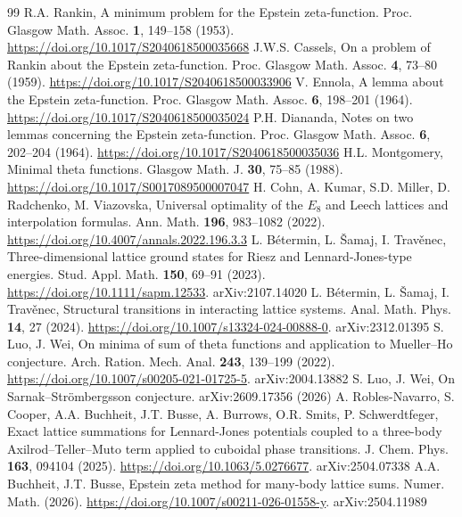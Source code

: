 \documentclass[10pt,twocolumn,a4paper]{article}
\theoremstyle{definition}
\begin{document}
\begin{thebibliography}{99}\footnotesize
{} R.A. Rankin, A minimum problem for the Epstein zeta-function. Proc. Glasgow Math. Assoc. \textbf{1}, 149--158 (1953). \url{https://doi.org/10.1017/S2040618500035668}
 J.W.S. Cassels, On a problem of Rankin about the Epstein zeta-function. Proc. Glasgow Math. Assoc. \textbf{4}, 73--80 (1959). \url{https://doi.org/10.1017/S2040618500033906}
 V. Ennola, A lemma about the Epstein zeta-function. Proc. Glasgow Math. Assoc. \textbf{6}, 198--201 (1964). \url{https://doi.org/10.1017/S2040618500035024}
 P.H. Diananda, Notes on two lemmas concerning the Epstein zeta-function. Proc. Glasgow Math. Assoc. \textbf{6}, 202--204 (1964). \url{https://doi.org/10.1017/S2040618500035036}
 H.L. Montgomery, Minimal theta functions. Glasgow Math. J. \textbf{30}, 75--85 (1988). \url{https://doi.org/10.1017/S0017089500007047}
 H. Cohn, A. Kumar, S.D. Miller, D. Radchenko, M. Viazovska, Universal optimality of the $E_8$ and Leech lattices and interpolation formulas. Ann. Math. \textbf{196}, 983--1082 (2022). \url{https://doi.org/10.4007/annals.2022.196.3.3}
 L. B\'etermin, L. \v{S}amaj, I. Trav\v{e}nec, Three-dimensional lattice ground states for Riesz and Lennard-Jones-type energies. Stud. Appl. Math. \textbf{150}, 69--91 (2023). \url{https://doi.org/10.1111/sapm.12533}. arXiv:2107.14020
 L. B\'etermin, L. \v{S}amaj, I. Trav\v{e}nec, Structural transitions in interacting lattice systems. Anal. Math. Phys. \textbf{14}, 27 (2024). \url{https://doi.org/10.1007/s13324-024-00888-0}. arXiv:2312.01395
 S. Luo, J. Wei, On minima of sum of theta functions and application to Mueller--Ho conjecture. Arch. Ration. Mech. Anal. \textbf{243}, 139--199 (2022). \url{https://doi.org/10.1007/s00205-021-01725-5}. arXiv:2004.13882
 S. Luo, J. Wei, On Sarnak--Str\"ombergsson conjecture. arXiv:2609.17356 (2026)
 A. Robles-Navarro, S. Cooper, A.A. Buchheit, J.T. Busse, A. Burrows, O.R. Smits, P. Schwerdtfeger, Exact lattice summations for Lennard-Jones potentials coupled to a three-body Axilrod--Teller--Muto term applied to cuboidal phase transitions. J. Chem. Phys. \textbf{163}, 094104 (2025). \url{https://doi.org/10.1063/5.0276677}. arXiv:2504.07338
 A.A. Buchheit, J.T. Busse, Epstein zeta method for many-body lattice sums. Numer. Math. (2026). \url{https://doi.org/10.1007/s00211-026-01558-y}. arXiv:2504.11989

\end{thebibliography}
\end{document}
